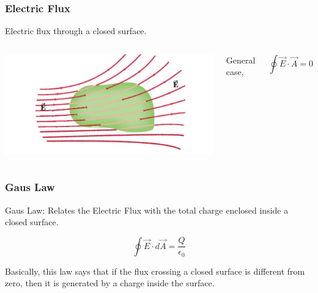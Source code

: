 \documentclass[]{beamer}
\begin{document}

\begin{frame}
\frametitle{Electric Flux}

Electric flux through a closed surface.
\pause

   \begin{columns}[c]
   \column{2in}  %

    \begin{center}
  \includegraphics[height=1.in]{images5/Eflux3.jpg}
\end{center}

  
   \column{2in}



General case,

\pause
\begin{equation*}
\oint \vec{E}\cdot\vec{A}=0
\end{equation*}


   \end{columns}



  \end{frame}


\begin{frame}
\frametitle{Gaus Law}

Gaus Law: Relates the Electric Flux with the total charge enclosed inside a closed surface.
\pause

\begin{equation}
\oint \vec{E}\cdot d\vec{A}=\frac{Q}{\epsilon_0}
\end{equation}

\pause


Basically, this law says that if the flux crossing a closed surface is different from zero, then it is generated by a charge inside the surface.

  \end{frame}



\end{document}
